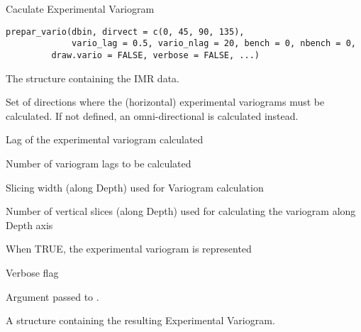 %
\begin{Description}\relax
Caculate Experimental Variogram
\end{Description}
%
\begin{Usage}
\begin{verbatim}
prepar_vario(dbin, dirvect = c(0, 45, 90, 135),
             vario_lag = 0.5, vario_nlag = 20, bench = 0, nbench = 0,
	     draw.vario = FALSE, verbose = FALSE, ...)
\end{verbatim}
\end{Usage}
%
\begin{Arguments}
\begin{ldescription}
\item[\code{dbin}] 
The  structure containing the IMR data.

\item[\code{dirvect}] 
Set of directions where the (horizontal) experimental variograms must be
calculated. If not defined, an omni-directional is calculated instead.

\item[\code{vario\_lag}] 
Lag of the experimental variogram calculated

\item[\code{vario\_nlag}] 
Number of variogram lags to be calculated

\item[\code{bench}] 
Slicing width (along Depth) used for Variogram calculation

\item[\code{nbench}] 
Number of vertical slices (along Depth) used for calculating the
variogram along Depth axis

\item[\code{draw.vario}] 
When TRUE, the experimental variogram is represented

\item[\code{verbose}] 
Verbose flag

\item[\code{...}] 
Argument passed to .

\end{ldescription}
\end{Arguments}
%
\begin{Value}
A  structure containing the resulting Experimental
Variogram.
\end{Value}
